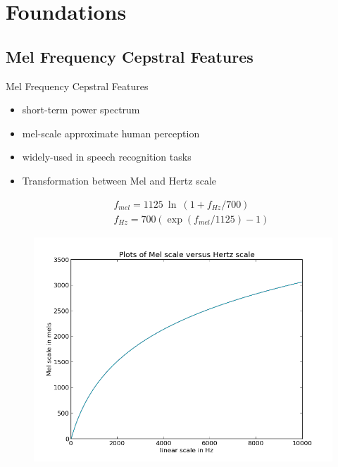 \section{Foundations} %
\subsection{Mel Frequency Cepstral Features}
	\begin{frame}[t]{Mel Frequency Cepstral Features}
		\begin{minipage}[t]{0.48\linewidth}
			\begin{itemize}
				\item short-term power spectrum 
				\item mel-scale approximate human perception
				\item widely-used in speech recognition tasks
				\item Transformation between Mel and Hertz scale
				\begin{figure}

				\begin{eqnarray}
				f_{mel} = 1125~\ln~(1+f_{Hz}/700)\\
				f_{Hz} = 700 \left(\exp(f_{mel}/1125)-1\right)
				\end{eqnarray}

			\end{figure}
			\end{itemize}
		\end{minipage}
		\begin{minipage}[t]{0.48\linewidth}
		\begin{figure}
		 \includegraphics[width = \linewidth]{MelvsHz.png}
		\end{figure}
		\end{minipage}
	\end{frame}


